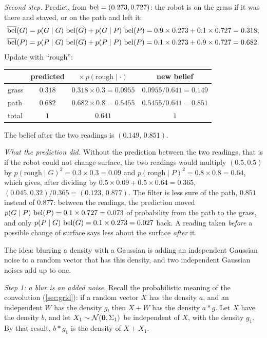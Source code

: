 \emph{Second step.} Predict, from $\operatorname{bel}=(0.273,0.727)$: the robot is on
the grass if it was there and stayed, or on the path and left it:
\begin{align*}
  \overline{\operatorname{bel}}(G)&=p(G\mid G)\,\operatorname{bel}(G)+p(G\mid P)\,\operatorname{bel}(P)
  =0.9\times0.273+0.1\times0.727=0.318,\\
  \overline{\operatorname{bel}}(P)&=p(P\mid G)\,\operatorname{bel}(G)+p(P\mid P)\,\operatorname{bel}(P)
  =0.1\times0.273+0.9\times0.727=0.682 .
\end{align*}
Update with ``rough'':
\begin{center}
\begin{tabular}{lccc}
  \toprule
  & predicted & $\times\,p(\text{rough}\mid\cdot)$ & new belief\\
  \midrule
  grass & $0.318$ & $0.318\times0.3=0.0955$ & $0.0955/0.641=0.149$\\
  path  & $0.682$ & $0.682\times0.8=0.5455$ & $0.5455/0.641=0.851$\\
  \midrule
  total & $1$ & $0.641$ & $1$\\
  \bottomrule
\end{tabular}
\end{center}
The belief after the two readings is $(0.149,\,0.851)$.

\emph{What the prediction did.} Without the prediction between the two
readings, that is if the robot could not change surface, the two readings
would multiply $(0.5,0.5)$ by $p(\text{rough}\mid G)^2=0.3\times0.3=0.09$
and $p(\text{rough}\mid P)^2=0.8\times0.8=0.64$, which gives, after
dividing by $0.5\times0.09+0.5\times0.64=0.365$,
$(0.045,0.32)/0.365=(0.123,\,0.877)$. The filter is less sure
of the path, $0.851$ instead of $0.877$: between the readings, the
prediction moved $p(G\mid P)\,\operatorname{bel}(P)=0.1\times0.727=0.073$ of
probability from the path to the grass, and only
$p(P\mid G)\,\operatorname{bel}(G)=0.1\times0.273=0.027$ back. A reading taken
\emph{before} a possible change of surface says less about the surface
\emph{after} it.

 The idea: blurring a density with a Gaussian is adding an
independent Gaussian noise to a random vector that has this density, and
two independent Gaussian noises add up to one.

\emph{Step 1: a blur is an added noise.} Recall the probabilistic meaning
of the convolution (\cref{sec:grid}): if a random vector $X$ has the
density $a$, and an independent $W$ has the density $g$, then $X+W$ has
the density $a\ast g$. Let $X$ have the density $b$, and let
$X_1\sim\mathcal{N}(\bm{0},\Sigma_1)$ be independent of $X$, with the density
$g_1$. By that result, $b\ast g_1$ is the density of $X+X_1$.

